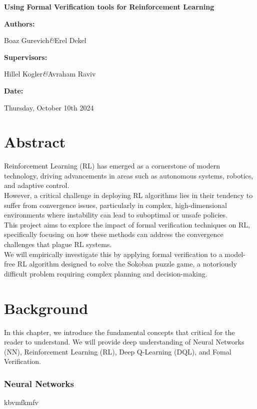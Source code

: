 \documentclass[12pt,a4paper]{report}
\newcommand{\projectname}{Using Formal Verification tools for Reinforcement Learning}
\newcommand{\firstauthor}{Boaz Gurevich}
\newcommand{\secondauthor}{Erel Dekel}
\newcommand{\firstsupervisor}{Hillel Kogler}
\newcommand{\secondsupervisor}{Avraham Raviv}
\newcommand{\submissiondate}{Thursday, October 10th 2024}
\renewcommand{\maketitle}{
    \begin{titlepage}
        \centering
        \vspace*{2cm}
        
        {\huge\bfseries\projectname\par}
        \vspace{1.5cm}
        
        {\large\textbf{Authors:}\par}
        \vspace{0.5cm}
        {\large\firstauthor\hspace{0.3cm}\textit{\&}\hspace{0.3cm}\secondauthor\par}
        
        \vspace{2cm}
        
        {\large\textbf{Supervisors:}\par}
        \vspace{0.5cm}
        {\large\firstsupervisor\hspace{0.3cm}\textit{\&}\hspace{0.3cm}\secondsupervisor\par}
        
        \vspace{2cm}

        {\large\textbf{Date:}\par}
        \vspace{0.5cm}
        {\large\submissiondate\par}
    \end{titlepage}
}
\begin{document}
\hypersetup{
    colorlinks=true,
    linkcolor=blue,
    urlcolor=blue,
    linktoc=all
}

\maketitle

\chapter*{Abstract}
Reinforcement Learning (RL) has emerged as a cornerstone of modern technology, driving advancements in areas such as autonomous systems, robotics, and adaptive control.\\
However, a critical challenge in deploying RL algorithms lies in their tendency to suffer from convergence issues, particularly in complex, high-dimensional environments where instability can lead to suboptimal or unsafe policies.\\
This project aims to explore the impact of formal verification techniques on RL, specifically focusing on how these methods can address the convergence challenges that plague RL systems.\\
We will empirically investigate this by applying formal verification to a model-free RL algorithm designed to solve the Sokoban puzzle game, a notoriously difficult problem requiring complex planning and decision-making.\\

\tableofcontents

\chapter{Background}
In this chapter, we introduce the fundamental concepts that critical for the reader to understand.
We will provide deep understanding of Neural Networks (NN), Reinforcement Learning (RL), Deep Q-Learning (DQL), and Fomal Verification.
\subsection{Neural Networks}
kbvmfkmfv
\end{document}
